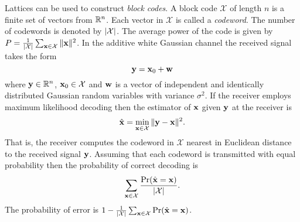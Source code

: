 \documentclass[draftcls, onecolumn, 11pt]{IEEEtran}
\begin{document}
\newcommand{\calX}{\mathcal X}
Lattices can be used to construct \emph{block codes}.  A block code $\calX$ of length $n$ is a finite set of vectors from ${\mathbb R}^n$.  Each vector in $\calX$ is called a \emph{codeword}.  The number of codewords is denoted by $\abs{\calX}$.  %
The average power of the code is given by $P = \frac{1}{\abs{\calX}}\sum_{\xbf \in \calX}\|\xbf\|^2$.  In the additive white Gaussian channel the received signal takes the form
\[
\mathbf{y} = \mathbf{x}_0 + \mathbf{w}
\]
where $\mathbf{y} \in {\mathbb R}^n$, $\xbf_0 \in \calX$ and $\mathbf{w}$ is a vector of independent and identically distributed Gaussian random variables with variance $\sigma^2$.  If the receiver employs maximum likelihood decoding then the estimator of $\mathbf{x}$ given $\mathbf{y}$ at the receiver is
\begin{equation}\label{eq:mldecoder}
\hat{\xbf} = \min_{\xbf \in \calX} \| \ybf - \xbf \|^2.
\end{equation}
That is, the receiver computes the codeword in $\calX$ nearest in Euclidean distance to the received signal $\mathbf{y}$.  Assuming that each codeword is transmitted with equal probability then the probability of correct decoding is
\[
\sum_{\xbf \in \calX} \frac{\prob( \hat{\xbf} = \xbf )}{\abs{\calX}}.
\]
The probability of error is $1 - \frac{1}{\abs{\calX}} \sum_{\xbf \in \calX} \prob( \hat{\xbf} = \xbf )$.  %
\end{document}
